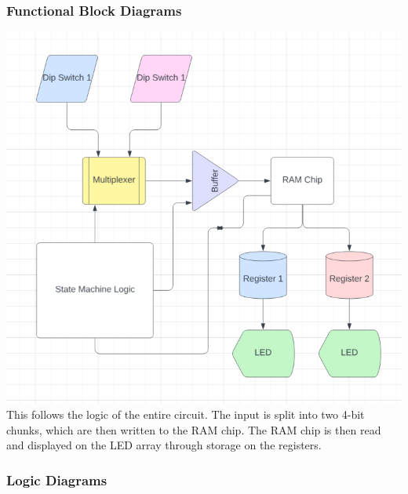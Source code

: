 \documentclass{article}
\begin{document}
        \subsubsection{Functional Block Diagrams}
        \begin{center}
            \includegraphics[width=1\textwidth]{FunctionalDiagram.png}
        This follows the logic of the entire circuit. The input is split into two 4-bit chunks, which are then written to the RAM chip. The RAM chip is then read and displayed on the LED array through storage on the registers.\\
        \end{center}

        \subsubsection{Logic Diagrams}
\end{document}
